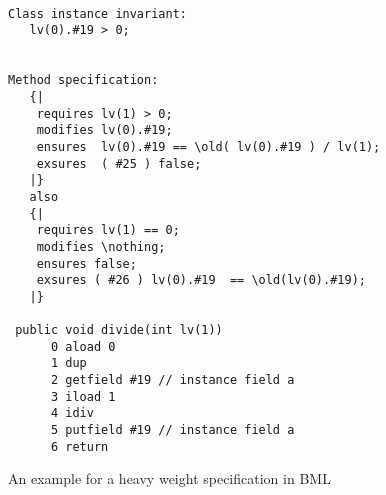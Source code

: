 \begin{figure}
\begin{lstlisting}[frame=trbl]

Class instance invariant: 
   lv(0).#19 > 0;
 

Method specification:
   {| 
    requires lv(1) > 0;
    modifies lv(0).#19;
    ensures  lv(0).#19 == \old( lv(0).#19 ) / lv(1);
    exsures  ( #25 ) false;  
   |}
   also 
   {|
    requires lv(1) == 0;
    modifies \nothing;
    ensures false;
    exsures ( #26 ) lv(0).#19  == \old(lv(0).#19);
   |}

 public void divide(int lv(1)) 
      0 aload 0
      1 dup
      2 getfield #19 // instance field a
      3 iload 1
      4 idiv
      5 putfield #19 // instance field a
      6 return
\end{lstlisting}
\caption{\sc An example for a heavy weight specification in BML} \label{bml:heavySpBML}
\end{figure}

